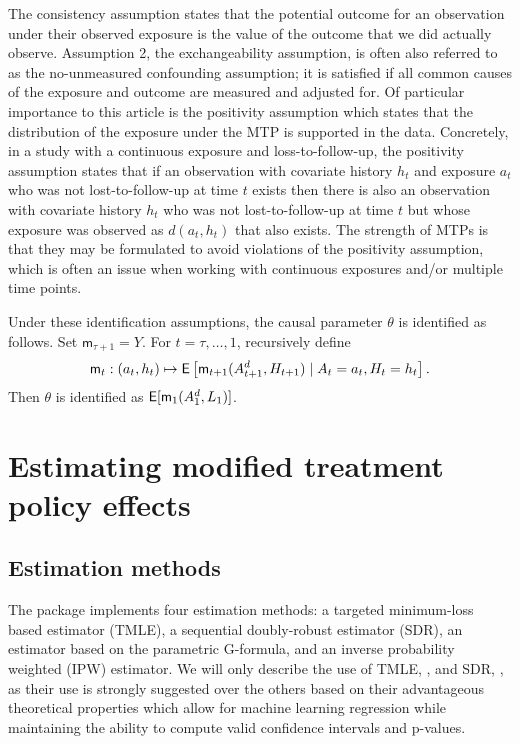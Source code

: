 \documentclass[]{jss}
\newcommand{\Q}{\mathsf{m}}
\begin{document}
The consistency assumption states that the potential outcome for an
observation under their observed exposure is the value of the outcome
that we did actually observe. Assumption 2, the exchangeability
assumption, is often also referred to as the no-unmeasured confounding
assumption; it is satisfied if all common causes of the exposure and
outcome are measured and adjusted for. Of particular importance to
this article is the positivity assumption which states that the
distribution of the exposure under the MTP is supported in the
data. Concretely, in a study with a continuous exposure and
loss-to-follow-up, the positivity assumption states that if an
observation with covariate history \(h_t\) and exposure \(a_t\) who
was not lost-to-follow-up at time \(t\) exists then there is also an
observation with covariate history \(h_t\) who was not
lost-to-follow-up at time \(t\) but whose exposure was observed as
\(d(a_t, h_t)\) that also exists. The strength of MTPs is that they
may be formulated to avoid violations of the positivity assumption,
which is often an issue when working with continuous exposures and/or
multiple time points.

Under these identification assumptions, the causal parameter $\theta$
is identified as follows. Set $\Q_{\tau+1}= Y$. For $t=\tau,\ldots,1$,
recursively define
\begin{equation}
  \Q_t:(a_t, h_t) \mapsto \E\left[\Q_{t+1}(A_{t+1}^d, H_{t+1})\mid
    A_t=a_t, H_t=h_t\right].\label{eq:defQ}
\end{equation} Then $\theta$ is identified as
$\E[\Q_1(A_1^d, L_1)]$.


\hypertarget{estimating-modified-treatment-policy-effects}{%
\section{Estimating modified treatment policy
effects}\label{estimating-modified-treatment-policy-effects}}

\hypertarget{estimation-methods}{%
\subsection{Estimation methods}\label{estimation-methods}}

The  package implements four estimation methods: a targeted
minimum-loss based estimator (TMLE), a sequential doubly-robust
estimator (SDR), an estimator based on the parametric G-formula, and an inverse
probability weighted (IPW) estimator. We will only describe the use of
TMLE, , and SDR, , as
their use is strongly suggested over the others based on their
advantageous theoretical properties which allow for machine learning
regression while maintaining the ability to compute valid confidence
intervals and p-values.
\end{document}
